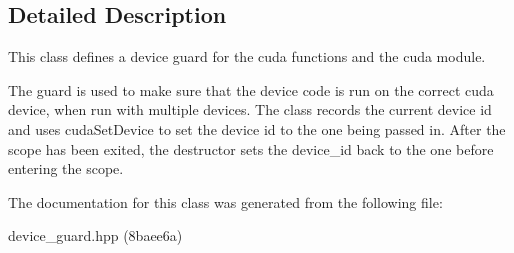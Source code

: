 \subsection{Detailed Description}
This class defines a device guard for the cuda functions and the cuda module. 

The guard is used to make sure that the device code is run on the correct cuda device, when run with multiple devices. The class records the current device id and uses {\ttfamily cuda\+Set\+Device} to set the device id to the one being passed in. After the scope has been exited, the destructor sets the device\+\_\+id back to the one before entering the scope. 

The documentation for this class was generated from the following file\+:\begin{DoxyCompactItemize}
\item 
device\+\_\+guard.\+hpp (8baee6a)\end{DoxyCompactItemize}
